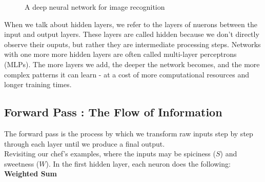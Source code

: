 \documentclass[9pt]{extarticle}
\theoremstyle{plain}
\theoremstyle{definition}
\theoremstyle{remark}
\begin{document}
\begin{figure}[h]
\begin{center}
    \end{center}
    \caption{A deep neural network for image recognition}
\end{figure}
When we talk about hidden layers, we refer to the layers of nuerons between the input and output layers. These layers are called hidden because we don't directly observe their ouputs, but rather they are intermediate processing steps. Networks with one more more hidden layers are often called multi-layer perceptrons (MLPs). The more layers we add, the deeper the network becomes, and the more complex patterns it can learn - at a cost of more computational resources and longer training times.
\subsection{Forward Pass : The Flow of Information}
The forward pass is the process by which we transform raw inputs step by step through each layer until we produce a final output.\\
Revisiting our chef's examples, where the inputs may be spiciness ($S$) and sweetness ($W$). In the first hidden layer, each neuron does the following:\\[2ex]
\textbf{Weighted Sum}





\end{document}
